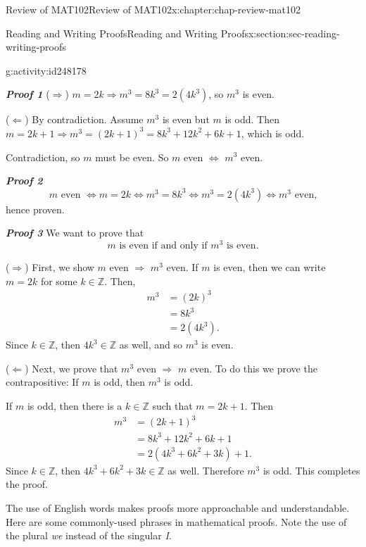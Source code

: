 \documentclass[oneside,10pt,]{book}
\newcommand{\alert}[1]{\textbf{\textit{#1}}}
\numberwithin{equation}{section}
\newcommand{\amp}{&}
\begin{document}
\begin{chapterptx}{Review of MAT102}{}{Review of MAT102}{}{}{x:chapter:chap-review-mat102}
\begin{sectionptx}{Reading and Writing Proofs}{}{Reading and Writing Proofs}{}{}{x:section:sec-reading-writing-proofs}
\begin{activity}{}{g:activity:id248178}
%
\par
\alert{Proof 1} (\(\Rightarrow\)) \(m = 2k \Rightarrow m^3 = 8k^3 = 2(4k^3)\), so \(m^3\) is even.%
\par
(\(\Leftarrow\)) By contradiction. Assume \(m^3\) is even but \(m\) is odd. Then \(m = 2k + 1 \Rightarrow m^3 =(2k+1)^3 = 8k^3 + 12k^2 + 6k + 1\), which is odd.%
\par
Contradiction, so \(m\) must be even. So \(m\) even \(\Leftrightarrow\) \(m^3\) even.%
\par
\alert{Proof 2}%
\begin{equation*}
m \text{ even } \Leftrightarrow m = 2k \Leftrightarrow m^3 = 8k^3 \Leftrightarrow  m^3 = 2(4k^3) \Leftrightarrow  m^3 \text{ even}\text{,}
\end{equation*}
hence proven.%
\par
\alert{Proof 3} We want to prove that%
\begin{equation*}
m \text{ is even if and only if } m^3 \text{ is even}\text{.}
\end{equation*}
%
\par
(\(\Rightarrow\)) First, we show \(m\) even \(\Rightarrow\) \(m^3\) even. If \(m\) is even, then we can write \(m = 2k\) for some \(k \in \mathbb{Z}\). Then,%
\begin{align*}
m^3 \amp = (2k)^3\\
\amp = 8k^3\\
\amp = 2(4k^3)\text{.}
\end{align*}
Since \(k \in \mathbb{Z}\), then \(4k^3 \in \mathbb{Z}\) as well, and so \(m^3\) is even.%
\par
(\(\Leftarrow\)) Next, we prove that \(m^3\) even \(\Rightarrow\) \(m\) even. To do this we prove the contrapositive: If \(m\) is odd, then \(m^3\) is odd.%
\par
If \(m\) is odd, then there is a \(k \in \mathbb{Z}\) such that \(m = 2k + 1\). Then%
\begin{align*}
m^3 \amp = (2k+1)^3\\
\amp = 8k^3 + 12k^2 + 6k + 1\\
\amp = 2(4k^3 + 6k^2 + 3k) + 1\text{.}
\end{align*}
Since \(k \in \mathbb{Z}\), then \(4k^3 + 6k^2 + 3k \in \mathbb{Z}\) as well. Therefore \(m^3\) is odd. This completes the proof.%
\end{activity}
The use of English words makes proofs more approachable and understandable. Here are some commonly-used phrases in mathematical proofs. Note the use of the plural \emph{we} instead of the singular \emph{I}.%

\end{sectionptx}
\end{chapterptx}
\end{document}
